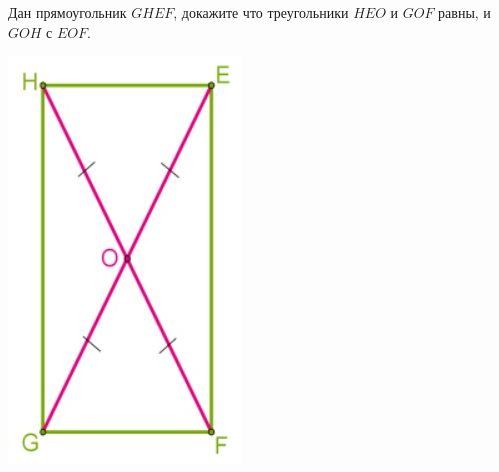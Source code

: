 \begin{class}[number=5]
\begin{listofex}
		\item
		\begin{minipage}[t]{0.79\textwidth}
			Дан прямоугольник \(GHEF\), докажите что треугольники \(HEO\) и \(GOF\) равны, и \(GOH\) с \(EOF\).
		\end{minipage}
		\begin{minipage}[c]{0.15\textwidth}
			\includegraphics[align=t, width=\textwidth]{pics/G71M4C5-1.jpg}
		\end{minipage}
		\item
		\begin{minipage}[t]{0.45\textwidth}

\end{minipage}
\end{listofex}
\end{class}
